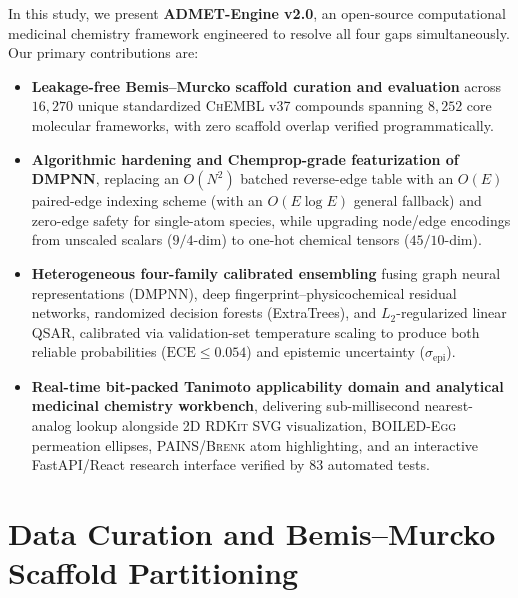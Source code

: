 \documentclass[10pt,twocolumn,letterpaper]{article}
\newcommand{\sige}{\sigma_{\mathrm{epi}}}
\begin{document}
In this study, we present \textbf{ADMET-Engine v2.0}, an open-source computational medicinal chemistry framework engineered to resolve all four gaps simultaneously. Our primary contributions are:
\begin{itemize}
  \item \textbf{Leakage-free Bemis–Murcko scaffold curation and evaluation} across $16{,}270$ unique standardized \textsc{ChEMBL} v37 compounds spanning $8{,}252$ core molecular frameworks, with zero scaffold overlap verified programmatically.
  \item \textbf{Algorithmic hardening and Chemprop-grade featurization of \textsc{DMPNN}}, replacing an $O(N^2)$ batched reverse-edge table with an $O(E)$ paired-edge indexing scheme (with an $O(E\log E)$ general fallback) and zero-edge safety for single-atom species, while upgrading node/edge encodings from unscaled scalars ($9/4$-dim) to one-hot chemical tensors ($45/10$-dim).
  \item \textbf{Heterogeneous four-family calibrated ensembling} fusing graph neural representations (\textsc{DMPNN}), deep fingerprint–physicochemical residual networks, randomized decision forests (ExtraTrees), and $L_2$-regularized linear \textsc{QSAR}, calibrated via validation-set temperature scaling to produce both reliable probabilities ($\mathrm{ECE} \le 0.054$) and epistemic uncertainty ($\sige$).
  \item \textbf{Real-time bit-packed Tanimoto applicability domain and analytical medicinal chemistry workbench}, delivering sub-millisecond nearest-analog lookup alongside 2D \textsc{RDKit} \textsc{SVG} visualization, \textsc{BOILED-Egg} permeation ellipses, \textsc{PAINS}/\textsc{Brenk} atom highlighting, and an interactive FastAPI/React research interface verified by $83$ automated tests.
\end{itemize}

\section{Data Curation and Bemis–Murcko Scaffold Partitioning}
\end{document}
